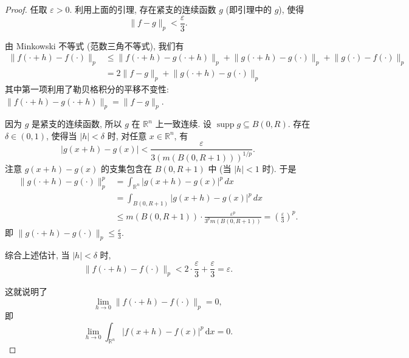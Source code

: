\documentclass[../main.tex]{subfiles}
\begin{document}
\begin{proof}
    任取 \(   \varepsilon > 0  \). 利用上面的引理, 存在紧支的连续函数 \( g \) (即引理中的 \( g \)), 使得
    \[
    \lVert f - g \rVert_{p} < \frac{\varepsilon}{3}.
    \]
    
    由 Minkowski 不等式 (范数三角不等式), 我们有
    \[
    \begin{aligned}
    \lVert f(\cdot+h) - f(\cdot) \rVert_{p} &\le \lVert f(\cdot+h) - g(\cdot+h) \rVert_{p} + \lVert g(\cdot+h) - g(\cdot) \rVert_{p} + \lVert g(\cdot) - f(\cdot) \rVert_{p} \\
    &= 2 \lVert f - g \rVert_{p} + \lVert g(\cdot+h) - g(\cdot) \rVert_{p}
    \end{aligned}
    \]
    其中第一项利用了勒贝格积分的平移不变性: \( \lVert f(\cdot+h) - g(\cdot+h) \rVert_{p} = \lVert f - g \rVert_{p} \).
    
    因为 \( g \) 是紧支的连续函数, 所以 \( g \) 在 \( \mathbb{R}^n \) 上一致连续. 设 \( \operatorname{supp} g \subseteq B(0, R) \). 
    存在 \( \delta \in (0, 1) \), 使得当 \( |h| < \delta \) 时, 对任意 \( x \in \mathbb{R}^n \), 有
    \[
    |g(x+h) - g(x)| < \frac{\varepsilon}{3 (m(B(0, R+1)))^{1/p}}.
    \]
    注意 \( g(x+h) - g(x) \) 的支集包含在 \( B(0, R+1) \) 中 (当 \( |h|<1 \) 时). 于是
    \[
    \begin{aligned}
    \lVert g(\cdot+h) - g(\cdot) \rVert_{p}^p &= \int_{\mathbb{R}^n} |g(x+h) - g(x)|^p \, dx \\
    &= \int_{B(0, R+1)} |g(x+h) - g(x)|^p \, dx \\
    &\le m(B(0, R+1)) \cdot \frac{\varepsilon^p}{3^p m(B(0, R+1))} = \left( \frac{\varepsilon}{3} \right)^p.
    \end{aligned}
    \]
    即 \( \lVert g(\cdot+h) - g(\cdot) \rVert_{p} \le \frac{\varepsilon}{3} \).
    
    综合上述估计, 当 \( |h| < \delta \) 时,
    \[
    \lVert f(\cdot+h) - f(\cdot) \rVert_{p} < 2 \cdot \frac{\varepsilon}{3} + \frac{\varepsilon}{3} = \varepsilon.
    \]
    
    这就说明了
    \[
    \lim_{h\to 0} \lVert f(\cdot+h) - f(\cdot) \rVert_{p} = 0,
    \]
    即
    \[
    \lim_{h\to 0} \int_{\mathbb{R}^{n}}\left| f\left( x+ h \right)-f\left( x \right)   \right|^{p}\,\mathrm{d} x= 0.
    \]
\end{proof}
\end{document}
